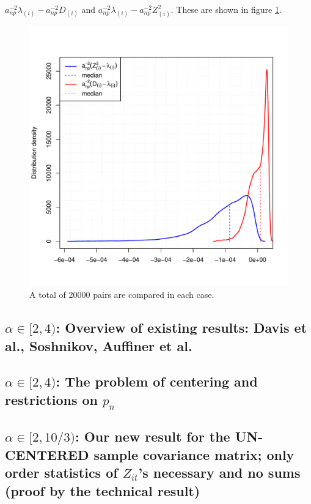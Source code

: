 \documentclass[11pt,reqno]{amsart}
\newcommand{\1}{\mathds{1}}
\newcommand{\0}{\boldsymbol{0}}
\newcommand{\4}{\mathchoice{\mskip1.5mu}{\mskip1.5mu}{}{}}
\newcommand{\5}{\mathchoice{\mskip-1.5mu}{\mskip-1.5mu}{}{}}
\newcommand{\2}{\penalty250\mskip\thickmuskip\mskip-\thinmuskip} %
\begin{document}
$a_{np}^{-2}\lambda_{(i)} - a_{np}^{-2}D_{(i)}$ and
$a_{np}^{-2}\lambda_{(i)} - a_{np}^{-2}Z^2_{(i)}$. These are shown in
figure \ref{fig:lambda_comparison}.
\begin{figure}[htb!]
  \centering
  \includegraphics[scale=0.40]{lambda_comparison.pdf}
  \caption{A total of 20000 pairs are compared in each case.}
  \label{fig:lambda_comparison}
\end{figure}




\subsection{\texorpdfstring{$\alpha \in [2,4)$}{alpha in [2,4)}: Overview of existing results: Davis et
  al., Soshnikov, Auffiner et al.}
\subsection{\texorpdfstring{$\alpha \in [2,4)$}{alpha in [2,4)}: The problem of centering and restrictions on \texorpdfstring{$p_n$}{p[n]}}
\subsection{\texorpdfstring{$\alpha \in [2,10/3)$}{alpha in [2,10/3)}: Our new result for the UN-CENTERED
  sample covariance matrix; only order statistics of \texorpdfstring{\texorpdfstring{$Z_{it}$}{Z[it]}}{Z[it]}'s
  necessary and no sums (proof by the technical result)}
\end{document}
